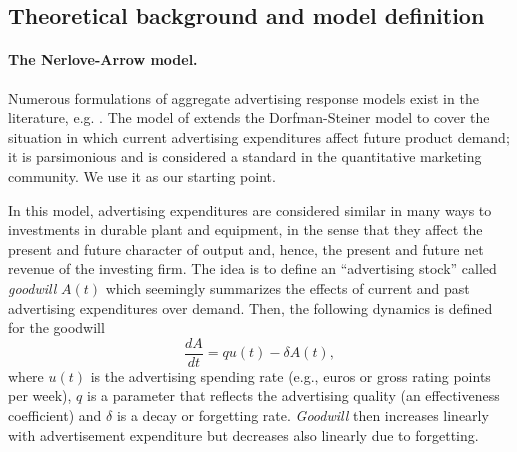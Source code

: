 


\subsection{Theoretical background and model definition}\label{sec:nerlove}


\paragraph{The Nerlove-Arrow model.}


Numerous formulations of aggregate advertising response models exist in the  literature, e.g. \parencite{little1979aggregate}. The model of  \textcite{nerlove1962optimal} extends the Dorfman-Steiner model to cover the situation in which current advertising expenditures affect future product demand; it is parsimonious and is considered a standard in the quantitative marketing community. We use it as our starting point.

In this model, advertising expenditures are considered similar in many ways to investments in durable plant and equipment, in the sense that they affect the present and future character of output and, hence, the present and future net revenue of the investing firm. The idea is to define an ``advertising stock'' called \emph{goodwill}  $A(t)$ which seemingly summarizes the effects of current and past advertising expenditures over demand. Then, the following dynamics is defined for the goodwill
\begin{equation}\label{eq:NA}
\frac{dA}{dt} = qu(t) - \delta A(t),
\end{equation}
where $u(t)$ is the advertising spending rate (e.g., euros or gross rating points per week), $q$ is a parameter that reflects the advertising quality (an effectiveness coefficient) and $\delta$ is a decay or forgetting rate. \emph{Goodwill} then increases linearly with  advertisement expenditure but decreases also linearly due to forgetting. %

